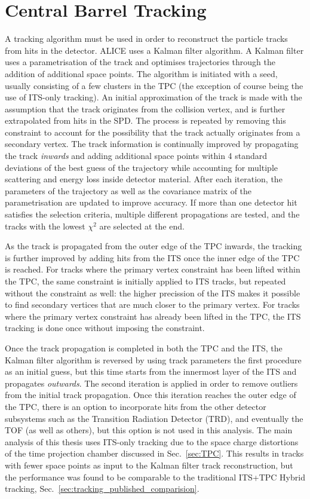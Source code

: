 \section{Central Barrel Tracking}

A tracking algorithm must be used in order to reconstruct the particle tracks from hits in the detector. ALICE uses a Kalman filter algorithm. A Kalman filter uses a parametrisation of the track and optimises trajectories through the addition of additional space points. The algorithm is initiated with a seed, usually consisting of a few clusters in the TPC (the exception of course being the use of ITS-only tracking). An initial approximation of the track is made with the assumption that the track originates from the collision vertex, and is further extrapolated from hits in the SPD. The process is repeated by removing this constraint to account for the possibility that the track actually originates from a secondary vertex. The track information is continually improved by propagating the track \textit{inwards} and adding additional space points within 4 standard deviations of the best guess of the trajectory while accounting for multiple scattering and energy loss inside detector material. After each iteration, the parameters of the trajectory as well as the covariance matrix of the parametrisation are updated to improve accuracy. If more than one detector hit satisfies the selection criteria, multiple different propagations are tested, and the tracks with the lowest $\chi^2$ are selected at the end.

As the track is propagated from the outer edge of the TPC inwards, the tracking is further improved by adding hits from the ITS once the inner edge of the TPC is reached. For tracks where the primary vertex constraint has been lifted within the TPC, the same constraint is initially applied to ITS tracks, but repeated without the constraint as well: the higher precission of the ITS makes it possible to find secondary vertices that are much closer to the primary vertex. For tracks where the primary vertex constraint has already been lifted in the TPC, the ITS tracking is done once without imposing the constraint.

Once the track propagation is completed in both the TPC and the ITS, the Kalman filter algorithm is reversed by using track parameters the first procedure as an initial guess, but this time starts from the innermost layer of the ITS and propagates \textit{outwards}. The second iteration is applied in order to remove outliers from the initial track propagation. Once this iteration reaches the outer edge of the TPC, there is an option to incorporate hits from the other detector subsystems such as the Transition Radiation Detector (TRD), and eventually the TOF (as well as others), but this option is not used in this analysis. The main analysis of this thesis uses ITS-only tracking due to the space charge distortions of the time projection chamber discussed in Sec.~\ref{sec:TPC}. This results in tracks with fewer space points as input to the Kalman filter track reconstruction, but the performance was found to be comparable to the traditional ITS+TPC Hybrid tracking, Sec.~\ref{sec:tracking_published_comparision}.

